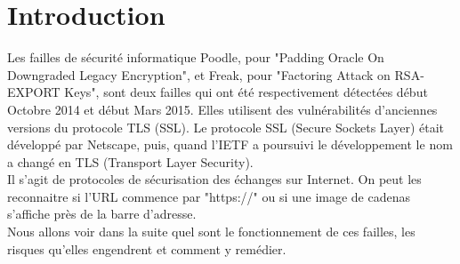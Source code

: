\section*{Introduction}

Les failles de sécurité informatique Poodle, pour "Padding Oracle On Downgraded Legacy Encryption", et Freak, pour "Factoring Attack on RSA-EXPORT Keys", sont deux failles qui ont été respectivement détectées début Octobre 2014 et début Mars 2015. Elles utilisent des vulnérabilités d'anciennes versions du protocole TLS (SSL). Le protocole SSL (Secure Sockets Layer) était développé par Netscape, puis, quand l'IETF a poursuivi le développement le nom a changé en TLS (Transport Layer Security). \\  
Il s'agit de protocoles de sécurisation des échanges sur Internet. On peut les reconnaitre si l'URL commence par "https://" ou si une image de cadenas s'affiche près de la barre d'adresse.\\ 
Nous allons voir dans la suite quel sont le fonctionnement de ces failles, les risques qu'elles engendrent et comment y remédier. 
